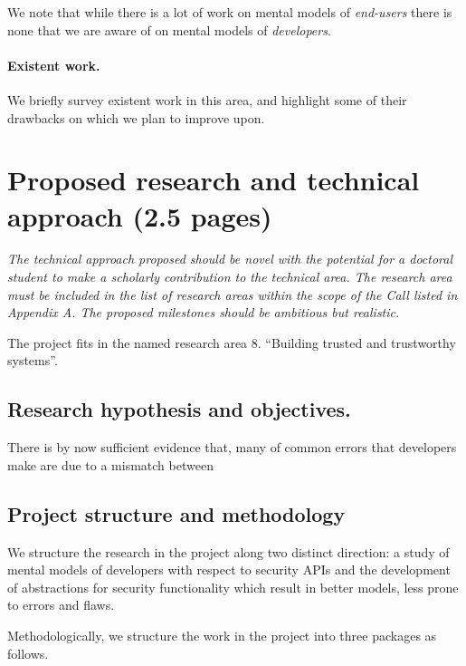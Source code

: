 \documentclass[10pt]{article}
\begin{document}
We note that while there is a lot of work on mental models of \emph{end-users} there is  none that we are aware of on mental models of \emph{developers}. 





\paragraph{Existent work.} We briefly survey existent work in this area, and highlight some of their drawbacks on which we plan to improve upon.

\section{Proposed research and technical approach (2.5 pages)}

\emph{The technical approach proposed should be novel with the potential for a doctoral student to make a scholarly contribution to the technical area. The research area must be included in the list of research areas within the scope of the Call listed in Appendix A. The proposed milestones should be ambitious but realistic.}




%
The project fits in the named research area 8. ``Building trusted and trustworthy systems''. 

\subsection{Research hypothesis and objectives.}


There is by now sufficient evidence that, many of common errors that developers make are due to a mismatch between 






\subsection{Project structure and methodology}


We structure the research in the project along two distinct direction: a study of mental models of developers with respect to security APIs and the development of abstractions for security functionality which result in better models, less prone to errors and flaws.  

Methodologically, we structure the work in the project into three packages as follows.
\end{document}
